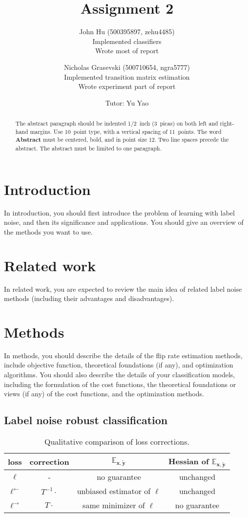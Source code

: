 \documentclass{article} %
\title{Assignment 2}
\author{
  John Hu (500395897, zehu4485)\\
  Implemented classifiers\\
  Wrote most of report
  \and
  Nicholas Grasevski (500710654, ngra5777)\\
  Implemented transition matrix estimation\\
  Wrote experiment part of report
  \and
  Tutor: Yu Yao
}
\begin{document}
\maketitle

\begin{abstract}
The abstract paragraph should be indented 1/2~inch (3~picas) on both left and
right-hand margins. Use 10~point type, with a vertical spacing of 11~points.
The word \textbf{Abstract} must be centered, bold, and in point size 12. Two
line spaces precede the abstract. The abstract must be limited to one
paragraph.
\end{abstract}

\section{Introduction}
In introduction, you should first introduce the problem of learning with label noise, and then its significance and applications. You should give an overview of the methods you want to use.

\section{Related work}
In related work, you are expected to review the main idea of related label noise methods (including their advantages and disadvantages).

\section{Methods}
In methods, you should describe the details of the flip rate estimation methods, include objective function, theoretical foundations (if any), and optimization algorithms. You should also describe the details of your classification models, including the formulation of the cost functions, the theoretical foundations or views (if any) of the cost functions, and the optimization methods.

\subsection{Label noise robust classification}
\begin{table}
\begin{tabular}{cccc}
loss & correction & $\mathbb{E}_{\boldsymbol{x},\tilde{\boldsymbol{y}}}$ & Hessian of $\mathbb{E}_{\boldsymbol{x},\tilde{\boldsymbol{y}}}$ \\\hline
$\ell$ & - & no guarantee & unchanged \\
$\ell^\leftarrow$ & $T^{-1}\cdot$ & unbiased estimator of $\ell$ & unchanged \\
$\ell^\rightarrow$ & $T\cdot$ & same minimizer of $\ell$ & no guarantee
\end{tabular}
\caption{Qualitative comparison of loss corrections. \label{tab:loss}}
\end{table}
\end{document}
